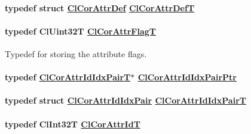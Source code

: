 \hypertarget{group__group13_ga13}{
\paragraph[ClCorAttrDefT]{\setlength{\rightskip}{0pt plus 5cm}typedef struct \hyperlink{struct_cl_cor_attr_def}{Cl\-Cor\-Attr\-Def} \hyperlink{struct_cl_cor_attr_def}{Cl\-Cor\-Attr\-Def\-T}}\hfill}
\label{group__group13_ga13}


\hypertarget{group__group13_ga5}{
\paragraph[ClCorAttrFlagT]{\setlength{\rightskip}{0pt plus 5cm}typedef Cl\-Uint32T \hyperlink{group__group13_ga5}{Cl\-Cor\-Attr\-Flag\-T}}\hfill}
\label{group__group13_ga5}


Typedef for storing the attribute flags. \hypertarget{group__group13_ga31}{
\paragraph[ClCorAttrIdIdxPairPtr]{\setlength{\rightskip}{0pt plus 5cm}typedef \hyperlink{struct_cl_cor_attr_id_idx_pair}{Cl\-Cor\-Attr\-Id\-Idx\-Pair\-T}$\ast$ \hyperlink{struct_cl_cor_attr_id_idx_pair}{Cl\-Cor\-Attr\-Id\-Idx\-Pair\-Ptr}}\hfill}
\label{group__group13_ga31}


\hypertarget{group__group13_ga30}{
\paragraph[ClCorAttrIdIdxPairT]{\setlength{\rightskip}{0pt plus 5cm}typedef struct \hyperlink{struct_cl_cor_attr_id_idx_pair}{Cl\-Cor\-Attr\-Id\-Idx\-Pair} \hyperlink{struct_cl_cor_attr_id_idx_pair}{Cl\-Cor\-Attr\-Id\-Idx\-Pair\-T}}\hfill}
\label{group__group13_ga30}


\hypertarget{group__group13_ga3}{
\paragraph[ClCorAttrIdT]{\setlength{\rightskip}{0pt plus 5cm}typedef Cl\-Int32T \hyperlink{group__group13_ga3}{Cl\-Cor\-Attr\-Id\-T}}\hfill}
\label{group__group13_ga3}


